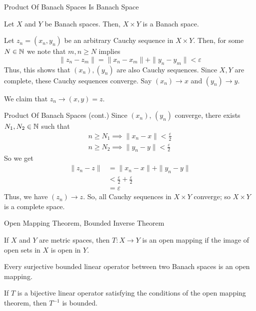 \documentclass[10pt]{beamer}
\begin{document}
		\begin{frame}{Product Of Banach Spaces Is Banach Space}
				\begin{theorem}[]
						Let $X$ and $Y$ be Banach spaces. Then, $X\times Y$ is a Banach space.
				\end{theorem}
				Let $z_n = (x_n, y_n)$ be an arbitrary Cauchy sequence in $X\times Y$. Then, for some $N\in \mathbb{N}$ we note that $m,n \geq N$ implies 
				\begin{equation*}
						\|z_n - z_m\| = \|x_n - x_m\| + \|y_n - y_m\| < \varepsilon
				\end{equation*}
				Thus, this shows that $(x_n), (y_n)$ are also Cauchy sequences. Since $X,Y$ are complete, these Cauchy sequences converge. Say $(x_n) \to x$ and $(y_n) \to y$. \par 

				We claim that $z_n \to (x, y) = z$. 
		\end{frame}

		\begin{frame}{Product Of Banach Spaces (cont.)}
				Since $(x_n)$, $(y_n)$ converge, there exists $N_1, N_2\in \mathbb{N}$ such that 
				\begin{align*}
						n\geq N_1 \implies \|x_n - x\| < \frac{\varepsilon}{2} \\ 
						n\geq N_2 \implies \|y_n - y\| < \frac{\varepsilon}{2}
				\end{align*}
				So we get 
				\begin{align*}
						\|z_n - z\| &= \|x_n - x\| + \|y_n - y\| \\ 
												&< \frac{\varepsilon}{2} + \frac{\varepsilon}{2} \\ 
												&= \varepsilon
				\end{align*}
				Thus, we have $(z_n) \to z$. So, all Cauchy sequences in $X\times Y$ converge; so $X\times Y$ is a complete space.
		\end{frame}

		\begin{frame}{Open Mapping Theorem, Bounded Inverse Theorem}
				\begin{definition}
						If $X$ and $Y$ are metric spaces, then $T: X\to Y$ is an \alert{open mapping} if the image of open sets in $X$ is open in $Y$. 
				\end{definition}

				\begin{theorem}
						Every surjective bounded linear operator between two Banach spaces is an open mapping. 
				\end{theorem}

				\begin{theorem}
						If $T$ is a bijective linear operator satisfying the conditions of the open mapping theorem, then $T^{-1}$ is bounded.
				\end{theorem}
		\end{frame}
\end{document}
